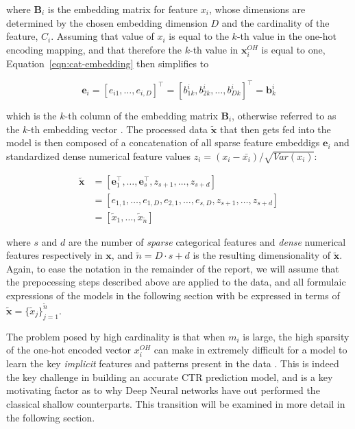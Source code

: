\documentclass{mldsmsc}
\begin{document}
where $\mathbf{B}_i$ is the embedding matrix for feature $x_i$, whose dimensions are determined
by the chosen embedding dimension $D$ and the cardinality of the feature, $C_i$. Assuming
that value of $x_i$ is equal to the $k$-th value in the one-hot encoding mapping, and that therefore
the $k$-th value in $\mathbf{x}_i^{OH}$ is equal to one, Equation~\ref{eqn:cat-embedding} then simplifies
to

\begin{equation}
    \mathbf{e}_i = \left[e_{i 1}, \ldots, e_{i, D} \right]^{\intercal}
    = \left[b_{1 k}^{i}, b_{2 k}^{i}, \ldots , b_{D k}^{i}\right]^{\intercal} = \mathbf{b}_{k}^{i}
\end{equation}

which is the $k$-th column of the embedding matrix $\mathbf{B}_i$, otherwise referred to as the $k$-th
embedding vector \citep{RefWorks:hancock2020survey}. The processed data $\tilde{\mathbf{x}}$ that then gets fed into the model is 
then composed of a concatenation of all sparse feature embeddigs $\mathbf{e}_i$ and standardized
dense numerical feature values
$z_i = (x_i - \bar{x_i})/\sqrt{Var(x_i)}$:

\begin{equation}
    \begin{split}
    \tilde{\mathbf{x}} &= \left[ \mathbf{e}_1^{\intercal}, \dots , \mathbf{e}_s^{\intercal}, z_{s+1}, \dots , z_{s+d} \right]\\
    &= \left[e_{1, 1}, \ldots, e_{1 ,D}, e_{2, 1}, \ldots , e_{s, D}, z_{s+1}, \ldots, z_{s+d}\right]\\
    &= \left[ \tilde{x}_1, \ldots, \tilde{x}_{\tilde{n}}\right]
    \end{split}
\end{equation}

where $s$ and $d$ are the number of \emph{sparse} categorical features and \emph{dense}
numerical features respectively in $\mathbf{x}$, and $\tilde{n} = D\cdot s + d$
is the resulting dimensionality of $\tilde{\mathbf{x}}$. Again, to ease the notation in the
remainder of the report, we will assume that the prepocessing steps described above
are applied to the data, and all formulaic expressions of the models in the following
section with be expressed in terms of $\tilde{\mathbf{x}} = \{\tilde{x}_j\}_{j=1}^{\tilde{n}}$.

The problem posed by high cardinality is that when $m_i$ is large, the high
sparsity of the one-hot encoded vector $x_i^{OH}$ can make in extremely difficult
for a model to learn the key \emph{implicit} features and patterns present in the
data \citep{RefWorks:gu2021ad}. This is indeed the key challenge in building an
accurate CTR prediction model, and is a key motivating factor as to why Deep Neural
networks have out performed the classical shallow counterparts. This transition will be examined
in more detail in the following section.
\end{document}
